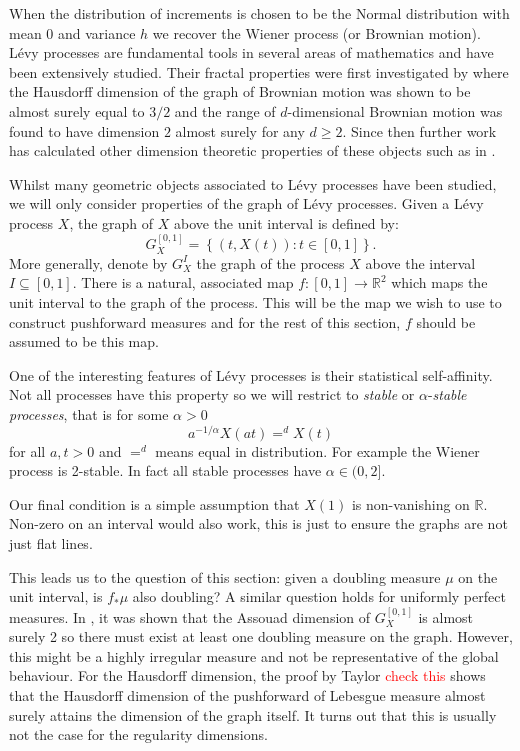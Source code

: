 \documentclass[12pt]{amsart}
\numberwithin{equation}{section}
\renewcommand{\ge}{\geqslant}
\begin{document}
When the distribution of increments is chosen to be the Normal distribution with mean 0 and variance $h$ we recover the Wiener process (or Brownian motion). L\'evy processes are fundamental tools in several areas of mathematics and have been extensively studied. Their fractal properties were first investigated by \cite{taylor 53} where the Hausdorff dimension of the graph of Brownian motion was shown to be almost surely equal to $3/2$ and the range of $d$-dimensional Brownian motion was found to have dimension $2$ almost surely for any $d \ge 2$. Since then further work has calculated other dimension theoretic properties of these objects such as in \cite{box dim, ass dim etc?}. 

Whilst many geometric objects associated to L\'evy processes have been studied, we will only consider properties of the graph of L\'evy processes. Given a L\'evy process $X$, the graph of $X$ above the unit interval is defined by:
\[
G_X^{[0,1]} = \left\{ (t,X(t)) \colon t \in [0,1] \right\}.
\]
More generally, denote by $G_X^I$ the graph of the process $X$ above the interval $I \subseteq [0,1]$. There is a natural, associated map $f: [0,1] \rightarrow \mathbb{R}^2$ which maps the unit interval to the graph of the process. This will be the map we wish to use to construct pushforward measures and for the rest of this section, $f$ should be assumed to be this map. 

One of the interesting features of L\'evy processes is their statistical self-affinity. Not all processes have this property so we will restrict to \textit{stable} or $\alpha$-\textit{stable processes}, that is for some $\alpha > 0$
\[
a^{-1/\alpha}X(at) =^d X(t)
\]
for all $a,t > 0$ and $=^d$ means equal in distribution. For example the Wiener process is 2-stable. In fact all stable processes have $\alpha \in (0,2]$. 

Our final condition is a simple assumption that $X(1)$ is non-vanishing on $\mathbb{R}$. Non-zero on an interval would also work, this is just to ensure the graphs are not just flat lines.

This leads us to the question of this section: given a doubling measure $\mu$ on the unit interval, is $f_*\mu$ also doubling? A similar question holds for uniformly perfect measures. In \cite{han and I}, it was shown that the Assouad dimension of $G_X^{[0,1]}$ is almost surely 2 so there must exist at least one doubling measure on the graph. However, this might be a highly irregular measure and not be representative of the global behaviour. For the Hausdorff dimension, the proof by Taylor \textcolor{red}{check this} shows that the Hausdorff dimension of the pushforward of Lebesgue measure almost surely attains the dimension of the graph itself. It turns out that this is usually not the case for the regularity dimensions.
\end{document}
